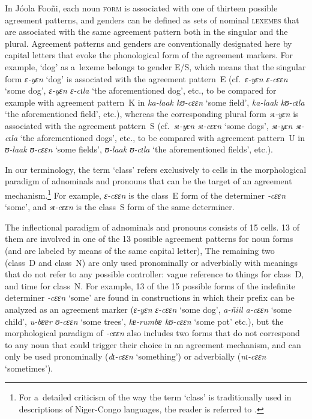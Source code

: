 \documentclass[output=paper]{langscibook}
\begin{document}
In Jóola Fooñi, each noun \textsc{form} is associated with one of thirteen
possible agreement patterns, and genders can be defined as sets of nominal
\textsc{lexemes} that are associated with the same agreement pattern both in
the singular and the plural.  Agreement patterns and genders are conventionally
designated here by capital letters that evoke the phonological form of the
agreement markers.  For example, `dog' as a~lexeme belongs to gender E/S, which
means that the singular form \textit{ɛ-yɛn} `dog' is associated with the
agreement pattern~E (cf.\ \textit{ɛ-yɛn ɛ-cɛɛn} `some dog', \textit{ɛ-yɛn ɛ-cɩla}
`the aforementioned dog', etc., to be compared for example with agreement
pattern~K in \textit{ka-laak kʊ-cɛɛn} `some field', \textit{ka-laak kʊ-cɩla} `the
aforementioned field', etc.), whereas the corresponding plural form
\textit{sɩ-yɛn} is associated with the agreement pattern~S (cf.\ \textit{sɩ-yɛn
  sɩ-cɛɛn} `some dogs', \textit{sɩ-yɛn sɩ-cɩla} `the aforementioned dogs', etc.,
to be compared with agreement pattern~U in \textit{ʊ-laak ʊ-cɛɛn} `some fields',
\textit{ʊ-laak ʊ-cɩla} `the aforementioned fields', etc.).

In our terminology, the term `class' refers exclusively to cells in the
morphological paradigm of adnominals and pronouns that can be the target of an
agreement mechanism.\footnote{ For a~detailed criticism of the way the term
  `class' is traditionally used in descriptions of Niger-Congo languages, the
  reader is referred to \citet{GüldemannFiedler2017}. } For example,
\textit{ɛ-cɛɛn} is the class~E form of the determiner \textit{‑cɛɛn} `some', and
\textit{sɩ-cɛɛn} is the class~S form of the same determiner.

The inflectional paradigm of adnominals and pronouns consists of 15 cells.  13
of them are involved in one of the 13 possible agreement patterns for noun
forms (and are labeled by means of the same capital letter), The remaining two
(class~D and class~N) are only used pronominally or adverbially with meanings
that do not refer to any possible controller: vague reference to things for
class~D, and time for class~N.  For example, 13 of the 15 possible forms of the
indefinite determiner \textit{‑cɛɛn} `some' are found in constructions in which
their prefix can be analyzed as an agreement marker (\textit{ɛ-yɛn ɛ-cɛɛn} `some
dog', \textit{a-ñiil a-cɛɛn} `some child', \textit{u-bɐɐr ʊ-cɛɛn} `some trees',
\textit{kɐ-rumbɐ kʊ-cɛɛn} `some pot' etc.), but the morphological paradigm of
\textit{‑cɛɛn} also includes two forms that do not correspond to any noun that
could trigger their choice in an agreement mechanism, and can only be used
pronominally (\textit{dɩ-cɛɛn} `something') or adverbially (\textit{nɩ-cɛɛn}
`sometimes').
\end{document}
